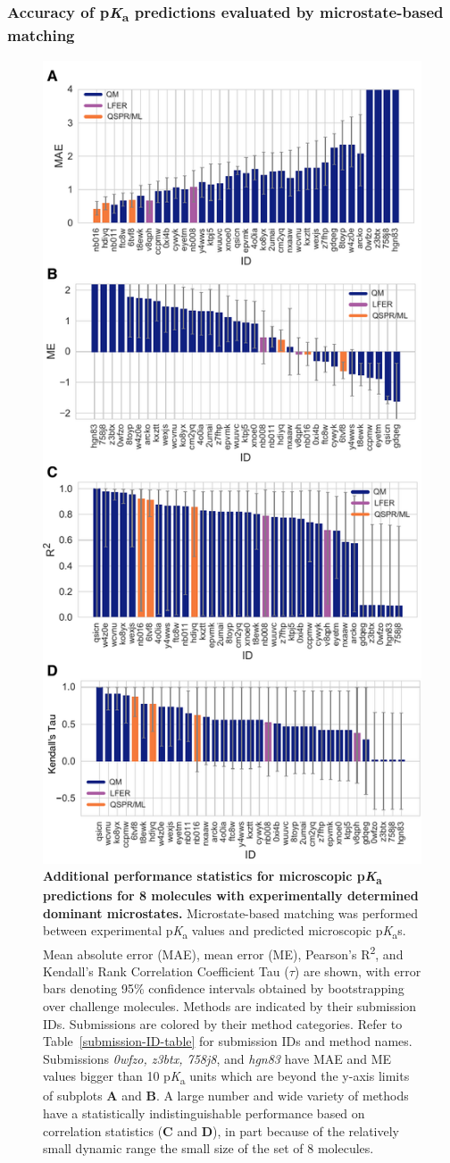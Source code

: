 \documentclass[9pt,lineno,final]{elife}
\newcommand{\pKa}{p\textit{K}\textsubscript{a}}
\begin{document}
\subsubsection{Accuracy of \pKa{} predictions evaluated by microstate-based matching}

\begin{figure}
\centering
\includegraphics[width=0.5\linewidth]{figures/typeI_statistics.pdf}
\caption{{\bf Additional performance statistics for microscopic \pKa{} predictions for 8 molecules with experimentally determined dominant microstates.} 
Microstate-based matching was performed between experimental \pKa{} values and predicted microscopic \pKa{}s. 
Mean absolute error (MAE), mean error (ME), Pearson’s R\textsuperscript{2}, and Kendall’s Rank Correlation Coefficient Tau ($\tau$) are shown, with error bars denoting 95\% confidence intervals obtained by bootstrapping over challenge molecules. Methods are indicated by their submission IDs. Submissions are colored by their method categories. Refer to Table~\ref{submission-ID-table} for submission IDs and method names. Submissions \textit{0wfzo, z3btx, 758j8}, and \textit{hgn83} have MAE and ME values bigger than 10 \pKa{} units which are beyond the y-axis limits of subplots {\bf A} and {\bf B}. A large number and wide variety of methods have a statistically indistinguishable performance based on correlation statistics ({\bf C} and {\bf D}), in part because of the relatively small dynamic range the small size of the set of 8 molecules.
}
\label{fig:typeI-statistics}
\end{figure}
\end{document}
